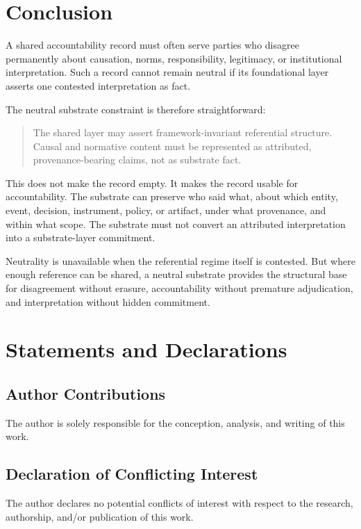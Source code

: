 \documentclass[11pt]{article}
\theoremstyle{plain}
\theoremstyle{definition}
\theoremstyle{remark}
\begin{document}
\section{Conclusion}
\label{sec:conclusion}

A shared accountability record must often serve parties who disagree
permanently about causation, norms, responsibility, legitimacy, or
institutional interpretation.
Such a record cannot remain neutral if its
foundational layer asserts one contested interpretation as fact.

The neutral substrate constraint is therefore straightforward:

\begin{quote}
  The shared layer may assert framework-invariant referential structure.
  Causal and normative content must be represented as
  attributed, provenance-bearing claims, not as substrate fact.
\end{quote}

This does not make the record empty.
It makes the record usable for accountability.
The substrate can preserve who said what, about which entity, event, decision,
instrument, policy, or artifact, under what provenance, and within what scope.
The substrate must not convert an attributed interpretation into a
substrate-layer commitment.

Neutrality is unavailable when the referential regime itself is contested.
But where enough reference can be shared, a neutral substrate provides the
structural base for disagreement without erasure, accountability without
premature adjudication, and interpretation without hidden commitment.

\section*{Statements and Declarations}

\subsection*{Author Contributions}
The author is solely responsible for the
conception, analysis, and writing of this work.

\subsection*{Declaration of Conflicting Interest}
The author declares no potential conflicts of interest with respect to the
research, authorship, and/or publication of this work.
\end{document}
